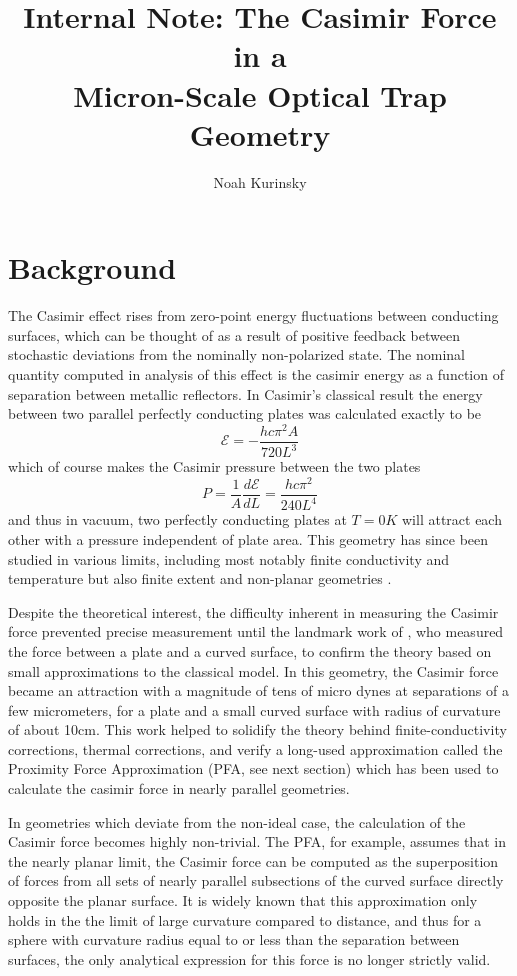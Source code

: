 \documentclass[11pt]{article}
\title{\vspace{-0.5in}Internal Note: The Casimir Force in a \\ Micron-Scale Optical Trap Geometry}
\author{Noah Kurinsky}
\newcommand{\E}{\mathcal{E}}
\begin{document}
\maketitle
{}

\section{Background}

The Casimir effect rises from zero-point energy fluctuations between conducting surfaces, which can be thought of as a result of positive feedback between stochastic deviations from the nominally non-polarized state. The nominal quantity computed in analysis of this effect is the casimir energy as a function of separation between metallic reflectors. In Casimir's classical result \citep{Casimir} the energy between two parallel perfectly conducting plates was calculated exactly to be \citep{ScatteringTheory}
$$
\E=-\frac{hc\pi^2A}{720L^3}
$$
which of course makes the Casimir pressure between the two plates
$$
P=\frac{1}{A}\frac{d\E}{dL}=\frac{hc\pi^2}{240L^4}
$$
and thus in vacuum, two perfectly conducting plates at $T=0K$ will attract each other with a pressure independent of plate area. This geometry has since been studied in various limits, including most notably finite conductivity and temperature \citep[][ and references therein]{ScatteringTheory} but also finite extent and non-planar geometries \citep[][ and references therein]{Rahi}.

Despite the theoretical interest, the difficulty inherent in measuring the Casimir force prevented precise measurement until the landmark work of \citet{Lamoreaux}, who measured the force between a plate and a curved surface, to confirm the theory based on small approximations to the classical model. In this geometry, the Casimir force became an attraction with a magnitude of tens of micro dynes at separations of a few micrometers, for a plate and a small curved surface with radius of curvature of about 10cm. This work helped to solidify the theory behind finite-conductivity corrections, thermal corrections, and verify a long-used approximation called the Proximity Force Approximation (PFA, see next section) which has been used to calculate the casimir force in nearly parallel geometries.

In geometries which deviate from the non-ideal case, the calculation of the Casimir force becomes highly non-trivial. The PFA, for example, assumes that in the nearly planar limit, the Casimir force can be computed as the superposition of forces from all sets of nearly parallel subsections of the curved surface directly opposite the planar surface. It is widely known that this approximation only holds in the the limit of large curvature compared to distance, and thus for a sphere with curvature radius equal to or less than the separation between surfaces, the only analytical expression for this force is no longer strictly valid.
\end{document}
